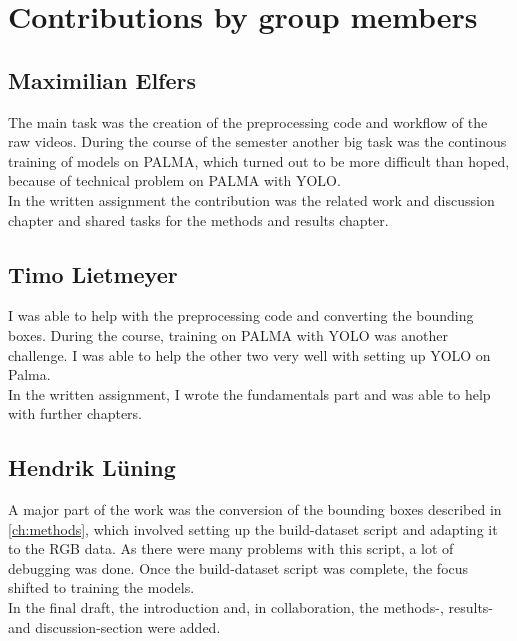 \chapter{Contributions by group members}
\label{ch:contributions}


\section{Maximilian Elfers}

The main task was the creation of the preprocessing code and workflow of the raw videos. During the course of the semester another big task was the continous training of models on PALMA, which turned out to be more difficult than hoped, because of technical problem on PALMA with YOLO. \\
In the written assignment the contribution was the related work and discussion chapter and shared tasks for the methods and results chapter.

\section{Timo Lietmeyer}
I was able to help with the preprocessing code and converting the bounding boxes. During the course, training on PALMA with YOLO was another challenge. I was able to help the other two very well with setting up YOLO on Palma. \\ In the written assignment, I wrote the fundamentals part and was able to help with further chapters.

\section{Hendrik Lüning}
A major part of the work was the conversion of the bounding boxes described in \ref{ch:methods}, which involved setting up the build-dataset script and adapting it to the RGB data. As there were many problems with this script, a lot of debugging was done. Once the build-dataset script was complete, the focus shifted to training the models. \\
In the final draft, the introduction and, in collaboration, the methods-, results- and discussion-section were added.
